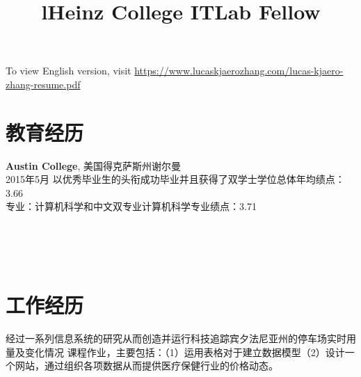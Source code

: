\documentclass[margin]{res}
\begin{document}
\begin{resume}


\section{}
To view English version, visit \href{https://www.lucaskjaerozhang.com/lucas-kjaero-zhang-resume.pdf}{https://www.lucaskjaerozhang.com/lucas-kjaero-zhang-resume.pdf}

\section{教育经历}
\textbf{Austin College}, 美国得克萨斯州谢尔曼\\
2015年5月 以优秀毕业生的头衔成功毕业并且获得了双学士学位\hfill 总体年均绩点：
3.66\\
专业：计算机科学和中文双专业\hfill 计算机科学专业绩点：3.71

\begin{format}
\title{l}\\
\\
\body\\
\end{format}

\section{工作经历}
\title{\textbf{Heinz College ITLab Fellow}}
\begin{position}
经过一系列信息系统的研究从而创造并运行科技追踪宾夕法尼亚州的停车场实时用量及变化情况
课程作业，主要包括：（1）运用表格对于建立数据模型（2）设计一个网站，通过组织各项数据从而提供医疗保健行业的价格动态。
\end{position}


\end{resume}
\end{document}
